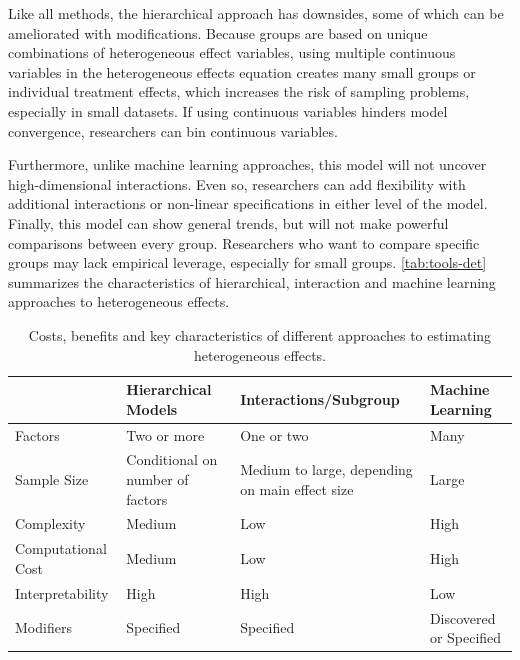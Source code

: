 \documentclass[12pt]{article}
\begin{document}
Like all methods, the hierarchical approach has downsides, some of which can be ameliorated with modifications. 
Because groups are based on unique combinations of heterogeneous effect variables, using multiple continuous variables in the heterogeneous effects equation creates many small groups or individual treatment effects, which increases the risk of sampling problems, especially in small datasets. 
If using continuous variables hinders model convergence, researchers can bin continuous variables.


Furthermore, unlike machine learning approaches, this model will not uncover high-dimensional interactions. 
Even so, researchers can add flexibility with additional interactions or non-linear specifications in either level of the model. 
Finally, this model can show general trends, but will not make powerful comparisons between every group. 
Researchers who want to compare specific groups may lack empirical leverage, especially for small groups.
\autoref{tab:tools-det} summarizes the characteristics of hierarchical, interaction and machine learning approaches to heterogeneous effects. 


\begin{table}
\begin{tabular}{|p{1in}|p{1.5in}|p{1.5in}|p{1.5in}|} \hline
                 & Hierarchical Models & Interactions/Subgroup & Machine Learning \\
\hline
Factors              & Two or more          & One or two         & Many \\ \hline
Sample Size          & Conditional on number of factors            & Medium to large, depending on main effect size    & Large \\ \hline
Complexity           & Medium             & Low                & High \\ \hline
Computational Cost   & Medium             & Low                & High \\ \hline
Interpretability     & High               & High               & Low \\ \hline
Modifiers            & Specified          & Specified      & Discovered or Specified \\
\hline
\end{tabular}
\caption{Costs, benefits and key characteristics of different approaches to estimating heterogeneous effects.}
\label{tab:tools-det}
\end{table}
\end{document}
